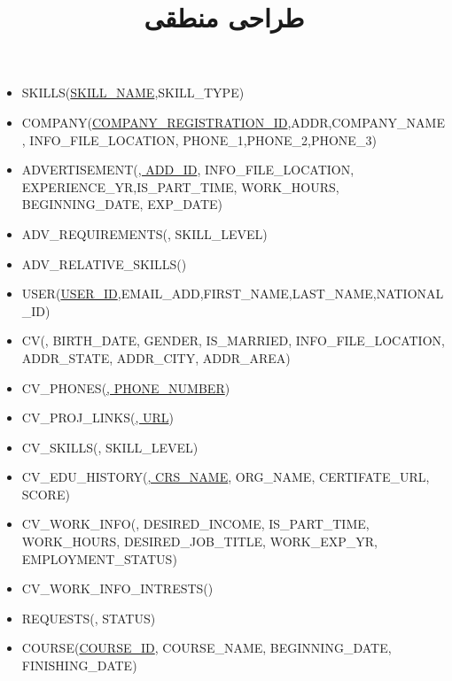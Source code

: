 \documentclass{article}
\title{طراحی منطقی}
\date{}
\begin{document}
\maketitle
\begin{flushleft}
    
    \begin{latin}
        \begin{itemize}
            \item SKILLS(\underline{SKILL\_NAME},SKILL\_TYPE)
            \item COMPANY(\underline{COMPANY\_REGISTRATION\_ID},ADDR,COMPANY\_NAME, INFO\_FILE\_LOCATION, PHONE\_1,PHONE\_2,PHONE\_3)
            \item ADVERTISEMENT(\underline{, ADD\_ID}, INFO\_FILE\_LOCATION, EXPERIENCE\_YR,IS\_PART\_TIME, WORK\_HOURS, BEGINNING\_DATE, EXP\_DATE)
            \item ADV\_REQUIREMENTS(\underline{}, SKILL\_LEVEL)
            \item ADV\_RELATIVE\_SKILLS(\underline{})
            \item USER(\underline{USER\_ID},EMAIL\_ADD,FIRST\_NAME,LAST\_NAME,NATIONAL\_ID)
            \item CV(\underline{}, BIRTH\_DATE, GENDER, IS\_MARRIED, INFO\_FILE\_LOCATION, ADDR\_STATE, ADDR\_CITY, ADDR\_AREA)
            \item CV\_PHONES(\underline{, PHONE\_NUMBER})
            \item CV\_PROJ\_LINKS(\underline{, URL})
            \item CV\_SKILLS(\underline{}, SKILL\_LEVEL)
            \item CV\_EDU\_HISTORY(\underline{, CRS\_NAME}, ORG\_NAME, CERTIFATE\_URL, SCORE)
            \item CV\_WORK\_INFO(\underline{}, DESIRED\_INCOME, IS\_PART\_TIME, WORK\_HOURS, DESIRED\_JOB\_TITLE, WORK\_EXP\_YR, EMPLOYMENT\_STATUS)
            \item CV\_WORK\_INFO\_INTRESTS(\underline{})
            \item REQUESTS(\underline{}, STATUS)
            \item COURSE(\underline{COURSE\_ID}, COURSE\_NAME, BEGINNING\_DATE, FINISHING\_DATE)

\end{itemize}
\end{latin}
\end{flushleft}
\end{document}
